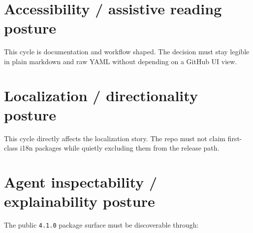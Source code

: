 \section{Accessibility / assistive reading posture}\label{record-203-accessibility-assistive-reading-posture}

This cycle is documentation and workflow shaped. The decision must stay legible in plain markdown and raw YAML without depending on a GitHub UI view.

\section{Localization / directionality posture}\label{record-203-localization-directionality-posture}

This cycle directly affects the localization story. The repo must not claim first-class i18n packages while quietly excluding them from the release path.

\section{Agent inspectability / explainability posture}\label{record-203-agent-inspectability-explainability-posture}

The public \texttt{4\allowbreak{}.\allowbreak{}1\allowbreak{}.\allowbreak{}0} package surface must be discoverable through:

